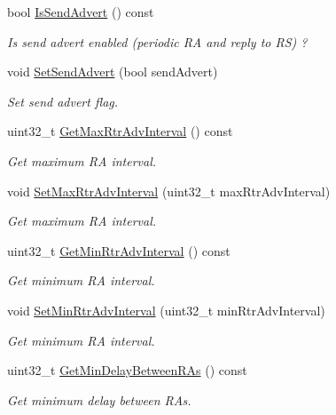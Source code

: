 \begin{DoxyCompactItemize}
bool \hyperlink{classns3_1_1RadvdInterface_a1e299a2433f7bcca53343503708969de}{Is\+Send\+Advert} () const 
\begin{DoxyCompactList}\small\item\em Is send advert enabled (periodic RA and reply to RS) ? \end{DoxyCompactList}\item 
void \hyperlink{classns3_1_1RadvdInterface_a434764c6e02744c96dd94fed8b1e2fa1}{Set\+Send\+Advert} (bool send\+Advert)
\begin{DoxyCompactList}\small\item\em Set send advert flag. \end{DoxyCompactList}\item 
uint32\+\_\+t \hyperlink{classns3_1_1RadvdInterface_adbe73f28222575ca1d47a2c24773c473}{Get\+Max\+Rtr\+Adv\+Interval} () const 
\begin{DoxyCompactList}\small\item\em Get maximum RA interval. \end{DoxyCompactList}\item 
void \hyperlink{classns3_1_1RadvdInterface_ab4e2639742f7d27535ebe59f138b8bbe}{Set\+Max\+Rtr\+Adv\+Interval} (uint32\+\_\+t max\+Rtr\+Adv\+Interval)
\begin{DoxyCompactList}\small\item\em Get maximum RA interval. \end{DoxyCompactList}\item 
uint32\+\_\+t \hyperlink{classns3_1_1RadvdInterface_a74f74794a26e22d667d0efba5f169a82}{Get\+Min\+Rtr\+Adv\+Interval} () const 
\begin{DoxyCompactList}\small\item\em Get minimum RA interval. \end{DoxyCompactList}\item 
void \hyperlink{classns3_1_1RadvdInterface_ac78ce3d3197c049c20d3ffbe5e8ccadc}{Set\+Min\+Rtr\+Adv\+Interval} (uint32\+\_\+t min\+Rtr\+Adv\+Interval)
\begin{DoxyCompactList}\small\item\em Get minimum RA interval. \end{DoxyCompactList}\item 
uint32\+\_\+t \hyperlink{classns3_1_1RadvdInterface_acf4275402d6aee55a5e2774acc9ea24b}{Get\+Min\+Delay\+Between\+R\+As} () const 
\begin{DoxyCompactList}\small\item\em Get minimum delay between R\+As. \end{DoxyCompactList}\item 

\end{DoxyCompactItemize}
